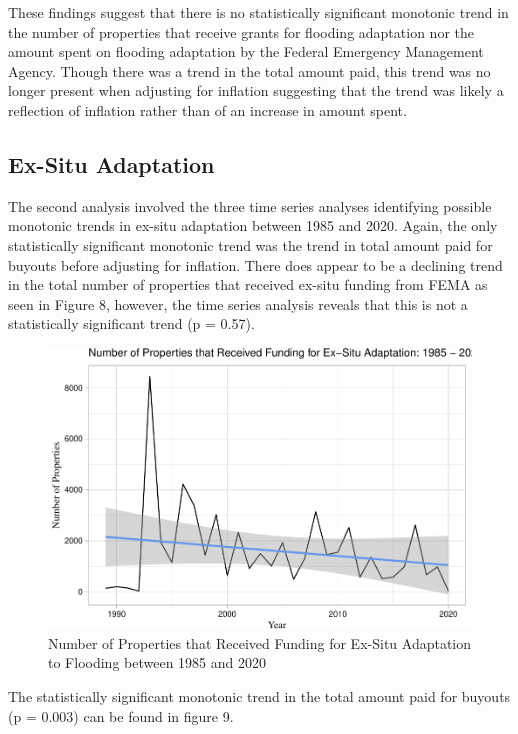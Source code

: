\documentclass[
  12pt,
]{article}
\begin{document}
These findings suggest that there is no statistically significant
monotonic trend in the number of properties that receive grants for
flooding adaptation nor the amount spent on flooding adaptation by the
Federal Emergency Management Agency. Though there was a trend in the
total amount paid, this trend was no longer present when adjusting for
inflation suggesting that the trend was likely a reflection of inflation
rather than of an increase in amount spent.

\hypertarget{ex-situ-adaptation}{%
\subsection{Ex-Situ Adaptation}\label{ex-situ-adaptation}}

The second analysis involved the three time series analyses identifying
possible monotonic trends in ex-situ adaptation between 1985 and 2020.
Again, the only statistically significant monotonic trend was the trend
in total amount paid for buyouts before adjusting for inflation. There
does appear to be a declining trend in the total number of properties
that received ex-situ funding from FEMA as seen in Figure 8, however,
the time series analysis reveals that this is not a statistically
significant trend (p = 0.57).

\begin{figure}
\centering
\includegraphics{finalreport_files/figure-latex/unnamed-chunk-15-1.pdf}
\caption{Number of Properties that Received Funding for Ex-Situ
Adaptation to Flooding between 1985 and 2020}
\end{figure}

\newpage

The statistically significant monotonic trend in the total amount paid
for buyouts (p = 0.003) can be found in figure 9.
\end{document}
